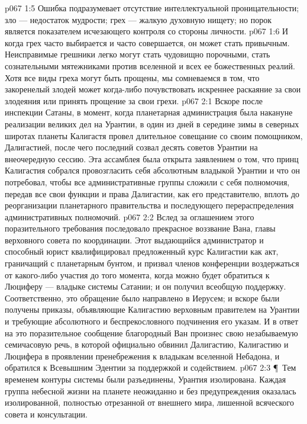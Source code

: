 \vs p067 1:5 Ошибка подразумевает отсутствие интеллектуальной проницательности; зло --- недостаток мудрости; грех --- жалкую духовную нищету; но порок является показателем исчезающего контроля со стороны личности.
\vs p067 1:6 И когда грех часто выбирается и часто совершается, он может стать привычным. Неисправимые грешники легко могут стать чудовищно порочными, стать сознательными мятежниками против вселенной и всех ее божественных реалий. Хотя все виды греха могут быть прощены, мы сомневаемся в том, что закоренелый злодей может когда\hyp{}либо почувствовать искреннее раскаяние за свои злодеяния или принять прощение за свои грехи.
\vs p067 2:1 Вскоре после инспекции Сатаны, в момент, когда планетарная администрация была накануне реализации великих дел на Урантии, в один из дней в середине зимы в северных широтах планеты Калигастя провел длительное совещание со своим помощником, Далигастией, после чего последний созвал десять советов Урантии на внеочередную сессию. Эта ассамблея была открыта заявлением о том, что принц Калигастия собрался провозгласить себя абсолютным владыкой Урантии и что он потребовал, чтобы все административные группы сложили с себя полномочия, передав все свои функции и права Далигастии, как его представителю, вплоть до реорганизации планетарного правительства и последующего перераспределения административных полномочий.
\vs p067 2:2 Вслед за оглашением этого поразительного требования последовало прекрасное воззвание Вана, главы верховного совета по координации. Этот выдающийся администратор и способный юрист квалифицировал предложенный курс Калигастии как акт, граничащий с планетарным бунтом, и призвал членов конференции воздержаться от какого\hyp{}либо участия до того момента, когда можно будет обратиться к Люциферу --- владыке системы Сатании; и он получил всеобщую поддержку. Соответственно, это обращение было направлено в Иерусем; и вскоре были получены приказы, объявляющие Калигастию верховным правителем на Урантии и требующие абсолютного и беспрекословного подчинения его указам. И в ответ на это поразительное сообщение благородный Ван произнес свою незабываемую семичасовую речь, в которой официально обвинил Далигастию, Калигастию и Люцифера в проявлении пренебрежения к владыкам вселенной Небадона, и обратился к Всевышним Эдентии за поддержкой и содействием.
\vs p067 2:3 \P\ Тем временем контуры системы были разъединены, Урантия изолирована. Каждая группа небесной жизни на планете неожиданно и без предупреждения оказалась изолированной, полностью отрезанной от внешнего мира, лишенной всяческого совета и консультации.
